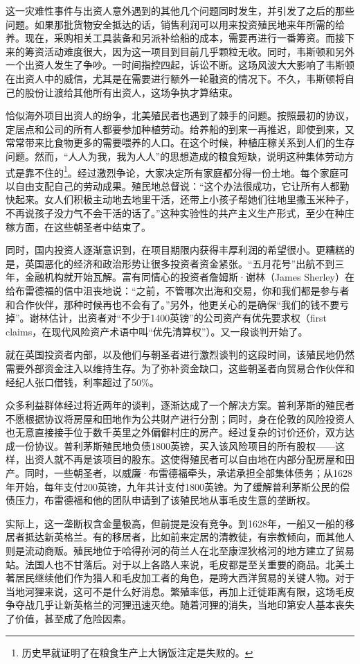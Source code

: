 \documentclass[12pt,oneside]{book}
\begin{document}
\begin{mdframed}
这一灾难性事件与出资人意外遇到的其他几个问题同时发生，并引发了之后的那些问题。如果那批货物安全抵达的话，销售利润可以用来投资殖民地来年所需的给养。现在，采购相关工具装备和另派补给船的成本，需要再进行一番筹资。而接下来的筹资活动难度很大，因为这一项目到目前几乎颗粒无收。同时，韦斯顿和另外一个出资人发生了争吵。一时间指控四起，诉讼不断。这场风波大大影响了韦斯顿在出资人中的威信，尤其是在需要进行额外一轮融资的情况下。不久，韦斯顿将自己的股份让渡给其他所有出资人，这场争执才算结束。

恰似海外项目出资人的纷争，北美殖民者也遇到了棘手的问题。按照最初的协议，定居点和公司的所有人都要参加种植劳动。给养船的到来一再推迟，即使到来，又常常带来比食物更多的需要喂养的人口。在这个时候，种植庄稼关系到人们的生存问题。然而，“人人为我，我为人人”的思想造成的粮食短缺，说明这种集体劳动方式是靠不住的\footnote{历史早就证明了在粮食生产上大锅饭注定是失败的。}。经过激烈争论，大家决定所有家庭都分得一份土地。每个家庭可以自由支配自己的劳动成果。殖民地总督说：“这个办法很成功，它让所有人都勤快起来。女人们积极主动地去地里干活，还带上小孩子帮她们往地里撒玉米种子，不再说孩子没力气不会干活的话了。”这种实验性的共产主义生产形式，至少在种庄稼方面，在这些朝圣者中结束了。

同时，国内投资人逐渐意识到，在项目期限内获得丰厚利润的希望很小。更糟糕的是，英国恶化的经济和政治形势让很多投资者资金紧张。“五月花号”出航不到三年，金融机构就开始瓦解。富有同情心的投资者詹姆斯·谢林（James Sherley）在给布雷德福的信中沮丧地说：“之前，不管哪次出海和交易，你和我们都是参与者和合作伙伴，那种时候再也不会有了。”另外，他更关心的是确保“我们的钱不要亏掉”。谢林估计，出资者对“不少于1400英镑”的公司资产有优先要求权（first claims，在现代风险资产术语中叫“优先清算权”）。又一段谈判开始了。

就在英国投资者内部，以及他们与朝圣者进行激烈谈判的这段时间，该殖民地仍然需要外部资金注入以维持生存。为了弥补资金缺口，这些朝圣者向贸易合作伙伴和经纪人张口借钱，利率超过了50\%。

众多利益群体经过将近两年的谈判，逐渐达成了一个解决方案。普利茅斯的殖民者不愿根据协议将房屋和田地作为公共财产进行分割；同时，身在伦敦的风险投资人也无意直接接手位于数千英里之外偏僻村庄的房产。经过复杂的讨价还价，双方达成一份协议。普利茅斯殖民地负债1800英镑，买入该风险项目的所有股权——这样，出资人就不再是该项目的股东。这使得殖民者可以自由地在内部分配房屋和田产。同时，一些朝圣者，以威廉·布雷德福牵头，承诺承担全部集体债务；从1628年开始，每年支付200英镑，九年共计支付1800英镑。为了缓解普利茅斯公民的偿债压力，布雷德福和他的团队申请到了该殖民地从事毛皮生意的垄断权。

实际上，这一垄断权含金量极高，但前提是没有竞争。到1628年，一船又一船的移居者抵达新英格兰。有的移居者，比如前来定居的清教徒，有宗教倾向，而其他人则是流动商贩。殖民地位于哈得孙河的荷兰人在北至康涅狄格河的地方建立了贸易站。法国人也不甘落后。对于以上各路人来说，毛皮都是至关重要的商品。北美土著居民继续他们作为猎人和毛皮加工者的角色，是跨大西洋贸易的关键人物。对于当地河狸来说，这可不是什么好消息。繁殖率低，再加上迁徙距离有限，这场毛皮争夺战几乎让新英格兰的河狸迅速灭绝。随着河狸的消失，当地印第安人基本丧失了价值，甚至成了危险因素。


\end{mdframed}
\end{document}
